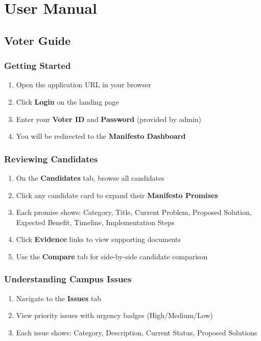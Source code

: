 \chapter{User Manual}
\label{app:user-manual}

\section{Voter Guide}
\label{sec:voter-guide}

\subsection{Getting Started}
\begin{enumerate}
    \item Open the application URL in your browser
    \item Click \textbf{Login} on the landing page
    \item Enter your \textbf{Voter ID} and \textbf{Password} (provided by admin)
    \item You will be redirected to the \textbf{Manifesto Dashboard}
\end{enumerate}

\subsection{Reviewing Candidates}
\begin{enumerate}
    \item On the \textbf{Candidates} tab, browse all candidates
    \item Click any candidate card to expand their \textbf{Manifesto Promises}
    \item Each promise shows: Category, Title, Current Problem, Proposed Solution, Expected Benefit, Timeline, Implementation Steps
    \item Click \textbf{Evidence} links to view supporting documents
    \item Use the \textbf{Compare} tab for side-by-side candidate comparison
\end{enumerate}

\subsection{Understanding Campus Issues}
\begin{enumerate}
    \item Navigate to the \textbf{Issues} tab
    \item View priority issues with urgency badges (High/Medium/Low)
    \item Each issue shows: Category, Description, Current Status, Proposed Solutions
\end{enumerate}

